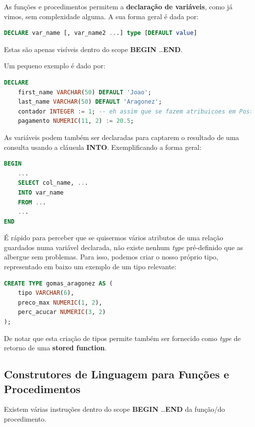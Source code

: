 \documentclass[oneside]{book}
\theoremstyle{definition}
\begin{document}
As funções e procedimentos permitem a \textbf{declaração de variáveis}, como já vimos, sem complexidade alguma. A sua forma geral é dada por:
\begin{lstlisting}[language=SQL, deletekeywords={VALUE}, morekeywords={FUNCTION, RETURNS, $$, LANGUAGE, DECLARE, IMMUTABLE}, framesep=8pt, xleftmargin=40pt, framexleftmargin=40pt, frame=tb, framerule=0pt]
DECLARE var_name [, var_name2 ...] type [DEFAULT value]
\end{lstlisting}
Estas são apenas visíveis dentro do scope \textbf{BEGIN} \dots \textbf{END}.

Um pequeno exemplo é dado por:
\begin{lstlisting}[language=SQL, deletekeywords={VALUE}, morekeywords={FUNCTION, RETURNS, $$, LANGUAGE, DECLARE, IMMUTABLE}, framesep=8pt, xleftmargin=40pt, framexleftmargin=40pt, frame=tb, framerule=0pt]
DECLARE 
    first_name VARCHAR(50) DEFAULT 'Joao';
    last_name VARCHAR(50) DEFAULT 'Aragonez';
    contador INTEGER := 1; -- eh assim que se fazem atribuicoes em PostgreSQL
    pagamento NUMERIC(11, 2) := 20.5;
\end{lstlisting}
As variáveis podem também ser declaradas para captarem o resultado de uma consulta usando a cláusula \textbf{INTO}. Exemplificando a forma geral:
\begin{lstlisting}[language=SQL, deletekeywords={VALUE}, morekeywords={INTO}, framesep=8pt, xleftmargin=40pt, framexleftmargin=40pt, frame=tb, framerule=0pt]
BEGIN
    ...
    SELECT col_name, ...
    INTO var_name
    FROM ...
    ...
END

\end{lstlisting}
É rápido para perceber que se quisermos vários atributos de uma relação guardados numa variável declarada, não existe nenhum \textit{type} pré-definido que as albergue sem problemas. Para isso, podemos criar o nosso próprio tipo, representado em baixo um exemplo de um tipo relevante:
\begin{lstlisting}[language=SQL, morekeywords={CREATE, TYPE}, framesep=8pt, xleftmargin=40pt, framexleftmargin=40pt, frame=tb, framerule=0pt]
CREATE TYPE gomas_aragonez AS (
    tipo VARCHAR(6),
    preco_max NUMERIC(1, 2),
    perc_acucar NUMERIC(3, 2)
);
\end{lstlisting}
De notar que esta criação de tipos permite também ser fornecido como \textit{type} de retorno de uma \textbf{stored function}.

\subsection{Construtores de Linguagem para Funções e Procedimentos}
Existem várias instruções dentro do scope \textbf{BEGIN} \dots \textbf{END} da função/do procedimento.
\end{document}
